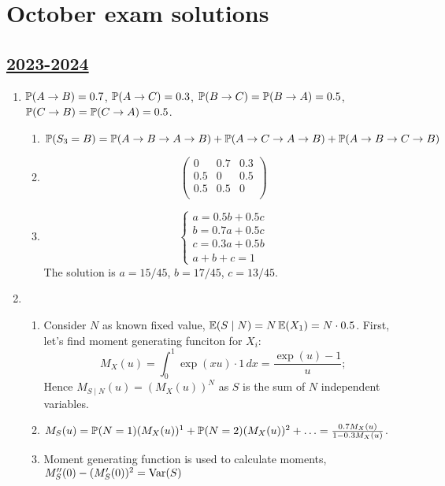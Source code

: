 
\newpage
\thispagestyle{empty}
\section{October exam solutions}



\subsection[2023-2024]{\hyperref[sec:kr_01_2023_2024]{2023-2024}}
\label{sec:sol_kr_01_2023_2024} %


\begin{enumerate}
    \item  $\P(A \to B) = 0.7$, 
    $\P(A \to C) = 0.3$, $\P(B \to C) = \P(B \to A) = 0.5$,  $\P(C \to B) = \P(C \to A) = 0.5$.
  
    \begin{enumerate}
      \item $\P(S_3 = B) = \P(A\to B\to A\to B) + \P(A\to C\to A\to B) + \P(A\to B\to C\to B)$
      \item 
      \[
      \begin{pmatrix}
        0 & 0.7 & 0.3 \\
        0.5 & 0 & 0.5 \\
        0.5 & 0.5 & 0 \\
      \end{pmatrix}  
      \]
      \item 
      \[
      \begin{cases}
        a = 0.5 b + 0.5 c \\
        b = 0.7 a + 0.5 c \\
        c = 0.3 a + 0.5 b \\
        a + b + c = 1  
      \end{cases}
      \]
      The solution is $a= 15/45$, $b=17/45$, $c=13/45$.
    \end{enumerate}
    


    \item
  
    \begin{enumerate}
      \item Consider $N$ as known fixed value, $\E(S \mid N) = N\E(X_1) = N\cdot 0.5$.
      First, let's find moment generating funciton for $X_i$:
      \[
      M_X(u) = \int_0^1 \exp(xu) \cdot 1 \, dx = \frac{\exp(u) - 1}{u}; 
      \]
      Hence $M_{S\mid N}(u) = (M_X(u))^N$ as $S$ is the sum of $N$ independent variables.
      \item $M_S(u) = \P(N=1)(M_X(u))^1 + \P(N=2)(M_X(u))^2 + \ldots = \frac{0.7 M_X(u)}{ 1 -0.3M_X(u)}$.
      \item Moment generating function is used to calculate moments, $M_S''(0) - (M_S'(0))^2 = \Var(S)$
    \end{enumerate}
  


\end{enumerate}
